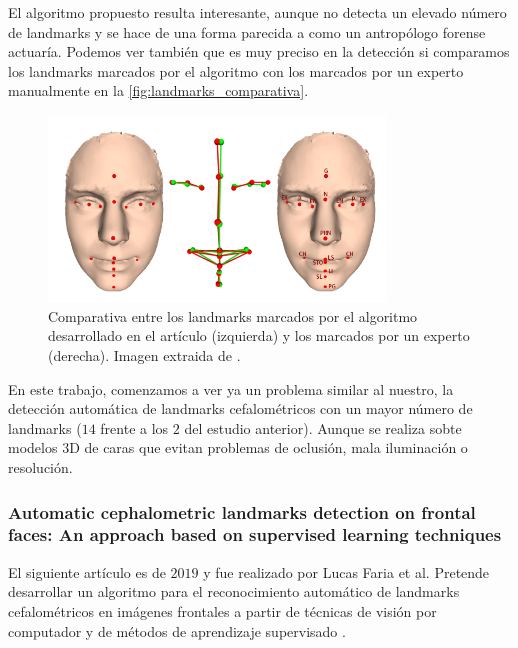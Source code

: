                 \medskip

                \noindent El algoritmo propuesto resulta interesante, aunque no detecta un elevado número de landmarks y se hace de una forma parecida a como un antropólogo forense actuaría. Podemos ver también que es muy preciso en la detección si comparamos los landmarks marcados por el algoritmo con los marcados por un experto manualmente en la \autoref{fig:landmarks_comparativa}.


                \begin{figure}[!h]
                    \centering
                    \includegraphics[width=0.8\textwidth]{img/comparativa_landmarks.png}
                    \caption{Comparativa entre los landmarks marcados por el algoritmo desarrollado en el artículo (izquierda) y los marcados por un experto (derecha). Imagen extraida de \cite{galvanek2015automated}.}
                    \label{fig:landmarks_comparativa}
                \end{figure}

                \medskip

                \noindent En este trabajo, comenzamos a ver ya un problema similar al nuestro, la detección automática de landmarks cefalométricos con un mayor número de landmarks ($14$ frente a los $2$ del estudio anterior). Aunque se realiza sobte modelos $3$D de caras que evitan problemas de oclusión, mala iluminación o resolución.

            \subsubsection{Automatic cephalometric landmarks detection on frontal faces: An approach based on supervised learning techniques}

                \noindent El siguiente artículo es de $2019$ y fue realizado por Lucas Faria et al. Pretende desarrollar un algoritmo para el reconocimiento automático de landmarks cefalométricos en imágenes frontales a partir de técnicas de visión por computador y de métodos de aprendizaje supervisado \cite{porto2019automatic}.

